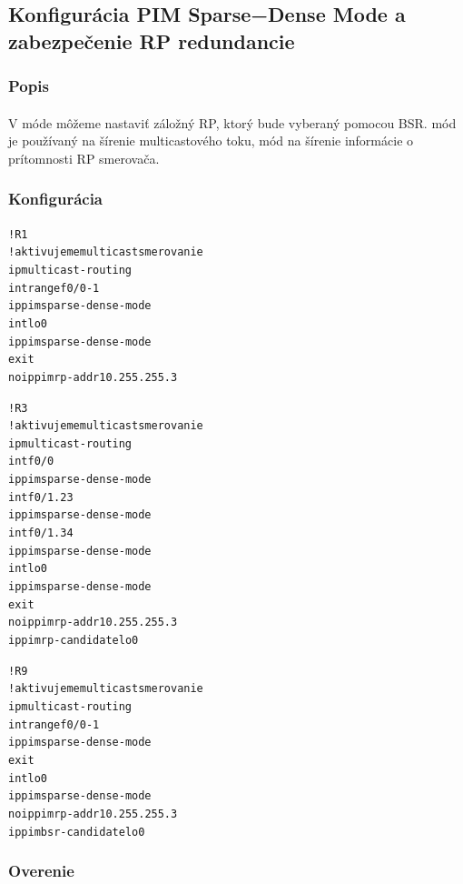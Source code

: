 \documentclass[12pt,twoside,a4paper]{report}
\begin{document}
\subsection{Konfigurácia PIM Sparse−Dense Mode a zabezpečenie RP redundancie}
\subsubsection{Popis}
\paragraph{}
V  móde môžeme nastaviť záložný RP, ktorý bude vyberaný pomocou BSR.  mód je používaný na šírenie multicastového toku,  mód na šírenie informácie o prítomnosti RP smerovača.

\subsubsection{Konfigurácia}

\noindent
{\selectfont
\begin{small}
\begin{alltt}
!R1
!aktivujeme multicast smerovanie
ip multicast-routing
int range f0/0 - 1
  ip pim sparse-dense-mode
int lo0
  ip pim sparse-dense-mode
  exit
no ip pim rp-addr 10.255.255.3

!R3
!aktivujeme multicast smerovanie
ip multicast-routing
int f0/0
  ip pim sparse-dense-mode
int f0/1.23
  ip pim sparse-dense-mode
int f0/1.34
  ip pim sparse-dense-mode
int lo0
  ip pim sparse-dense-mode
  exit
no ip pim rp-addr 10.255.255.3
ip pim rp-candidate lo0

!R9
!aktivujeme multicast smerovanie
ip multicast-routing
int range f0/0 - 1
  ip pim sparse-dense-mode
  exit
int lo0
  ip pim sparse-dense-mode
no ip pim rp-addr 10.255.255.3
ip pim bsr-candidate lo0
\end{alltt}
\end{small}
}

\subsubsection{Overenie}
\end{document}
